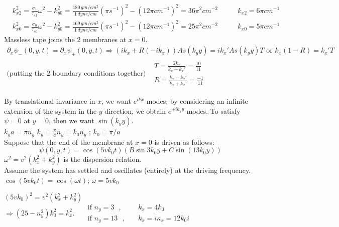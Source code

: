 \documentclass[twoside,10pt]{amsart}
\newcommand{\problemhead}[1]
  {\smallskip
   \noindent{\large\bf Problem #1.}
   \smallskip}
\begin{document}
\[
\begin{aligned}
  & k_{x2}^2 = \frac{ \sigma_1}{ \tau_{s1}} \omega^2 - k_{y0}^2 = \frac{ 180 \, gm/cm^2 }{ 1 \, dyne/cm } (\pi s^{-1})^2 - (12 \pi cm^{-1})^2 = 36 \pi^2 cm^{-2} \quad \quad & \boxed{ k_{x2} = 6 \pi cm^{-1} }\\
  & k_{x0}^2 = \frac{ \sigma_0}{ \tau_{s0}} \omega^2 - k_{y0}^2 = \frac{ 169 \, gm/cm^2 }{ 1 \, dyne/cm } (\pi s^{-1})^2 - (12 \pi cm^{-1})^2 = 25 \pi^2 cm^{-2} \quad \quad & \boxed{ k_{x0} = 5 \pi cm^{-1} }
\end{aligned}
\]
Massless tape joins the 2 membranes at $x=0$.  
\[
\begin{gathered}
\partial_x \psi_-(0,y,t) = \partial_x \psi_+(0,y,t) \Longrightarrow (ik_x + R(-ik_x))A s(k_y y) = i k_x' A s(k_y y)T \text{ or } k_x(1-R) = k_x' T \\
\text{(putting the 2 boundary conditions together)} \begin{aligned}
  & \boxed{ T = \frac{ 2 k_x}{k_x + k_x'} = \frac{10}{11} } \\
  & \boxed{ R = \frac{k_x - k_x'}{k_x+k_x'} = \frac{-1}{11} }
\end{aligned}
\end{gathered}
\]

\problemhead{11.7} By translational invariance in $x$, we want $e^{ikx}$ modes; by considering an infinite extension of the system in the $y$-direction, we obtain $e^{ \pm i k_y y}$ modes.  To satisfy $\psi = 0$ at $y=0$, then we want $\sin{ (k_y y)}$.  \medskip \\
$k_y a = \pi n_y$ $k_y = \frac{ \pi}{a} n_y = k_0 n_y$ ; $\boxed{ k_0 = \pi/a }$ \medskip \\

Suppose that the end of the membrane at $x=0$ is driven as follows:
\[
\psi(0,y,t) = \cos{ (5 vk_0 t) } (B\sin{ 3k_0 y} + C \sin{ (13k_0 y) } )
\]
$\omega^2 = v^2 ( k_x^2 + k_y^2 )$ is the dispersion relation.\\
Assume the system has settled and oscillates (entirely) at the driving frequency.  
$\cos{ (5vk_0 t) } = \cos{(\omega t)}$; \quad $\omega = 5 vk_0$

$(5vk_0)^2 = v^2 ( k_x^2 + k_y^2)$ \\
$\Longrightarrow (25 - n_y^2) k_0^2 = k_x^2$.  \quad \quad $\begin{aligned} 
  & \text{ if $n_y =3 $ }, \quad & k_x = 4 k_0 \\
  & \text{ if $n_y = 13$ }, \quad & k_x = i \kappa_x = 12 k_0 i
\end{aligned}$
\end{document}
